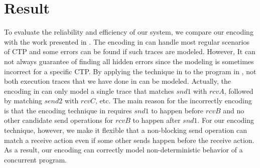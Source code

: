 \section{Result}
To evaluate the reliability and efficiency of our system, we compare our encoding with the work presented in \cite{elwakil:padtad10}.
The encoding in \cite{elwakil:padtad10} can handle most regular scenarios of CTP and some errors can be found if such traces are modeled. However, It can not always guarantee of finding all hidden errors since the modeling is sometimes incorrect for a specific CTP. By applying the technique in \cite{elwakil:padtad10} to the program in , not both execution traces that we have done in  can be modeled. Actually, the encoding in \cite{elwakil:padtad10} can only model a single trace that matches $snd1$ with $rcvA$, followed by matching $send2$ with $rcvC$, etc. The main reason for the incorrectly encoding is that the encoding technique in \cite{elwakil:padtad10} requires $snd1$ to happen before $rcvB$ and no other candidate send operations for $rcvB$ to happen after $snd1$. For our encoding technique, however, we make it flexible that a non-blocking send operation can match a receive action even if some other sends happen before the receive action. As a result, our encoding can correctly model non-deterministic behavior of a concurrent program.

